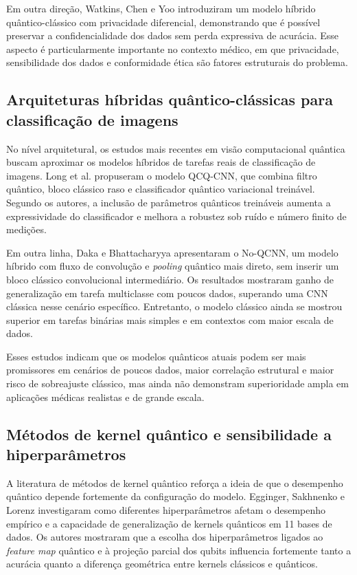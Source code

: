 Em outra direção, Watkins, Chen e Yoo \cite{watkins2023} introduziram um modelo híbrido quântico-clássico com privacidade diferencial, demonstrando que é possível preservar a confidencialidade dos dados sem perda expressiva de acurácia. Esse aspecto é particularmente importante no contexto médico, em que privacidade, sensibilidade dos dados e conformidade ética são fatores estruturais do problema.

\subsection{Arquiteturas híbridas quântico-clássicas para classificação de imagens}

No nível arquitetural, os estudos mais recentes em visão computacional quântica buscam aproximar os modelos híbridos de tarefas reais de classificação de imagens. Long et al. \cite{long2025} propuseram o modelo QCQ-CNN, que combina filtro quântico, bloco clássico raso e classificador quântico variacional treinável. Segundo os autores, a inclusão de parâmetros quânticos treináveis aumenta a expressividade do classificador e melhora a robustez sob ruído e número finito de medições.

Em outra linha, Daka e Bhattacharyya \cite{daka2026} apresentaram o No-QCNN, um modelo híbrido com fluxo de convolução e \textit{pooling} quântico mais direto, sem inserir um bloco clássico convolucional intermediário. Os resultados mostraram ganho de generalização em tarefa multiclasse com poucos dados, superando uma CNN clássica nesse cenário específico. Entretanto, o modelo clássico ainda se mostrou superior em tarefas binárias mais simples e em contextos com maior escala de dados.

Esses estudos indicam que os modelos quânticos atuais podem ser mais promissores em cenários de poucos dados, maior correlação estrutural e maior risco de sobreajuste clássico, mas ainda não demonstram superioridade ampla em aplicações médicas realistas e de grande escala.

\subsection{Métodos de kernel quântico e sensibilidade a hiperparâmetros}

A literatura de métodos de kernel quântico reforça a ideia de que o desempenho quântico depende fortemente da configuração do modelo. Egginger, Sakhnenko e Lorenz \cite{egginger2024} investigaram como diferentes hiperparâmetros afetam o desempenho empírico e a capacidade de generalização de kernels quânticos em 11 bases de dados. Os autores mostraram que a escolha dos hiperparâmetros ligados ao \textit{feature map} quântico e à projeção parcial dos qubits influencia fortemente tanto a acurácia quanto a diferença geométrica entre kernels clássicos e quânticos.

